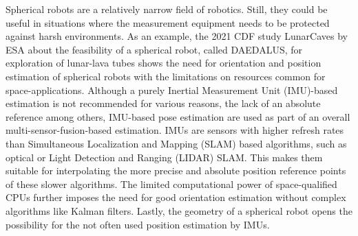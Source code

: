 \documentclass[letterpaper, 10 pt, conference]{ieeeconf}  %
\begin{document}
Spherical robots are a relatively narrow field of robotics. Still, they could be useful in situations where the measurement equipment needs to be protected against harsh environments.
As an example, the 2021 CDF study LunarCaves by ESA about the feasibility of a spherical robot, called DAEDALUS, for exploration of lunar-lava tubes \cite{rossi2021daedalus} shows the need for orientation and position estimation of spherical robots with the limitations on resources common for space-applications.
Although a purely Inertial Measurement Unit (IMU)-based estimation is not recommended for various reasons, the lack of an absolute reference among others, IMU-based pose estimation are used as part of an overall multi-sensor-fusion-based estimation.
IMUs are sensors with higher refresh rates than Simultaneous Localization and Mapping (SLAM) based algorithms, such as optical or Light Detection and Ranging (LIDAR) SLAM. This makes them suitable for interpolating the more precise and absolute position reference points of these slower algorithms.
The limited computational power of space-qualified CPUs further imposes the need for good orientation estimation without complex algorithms like Kalman filters.
Lastly, the geometry of a spherical robot opens the possibility for the not often used position estimation by IMUs.
\end{document}
